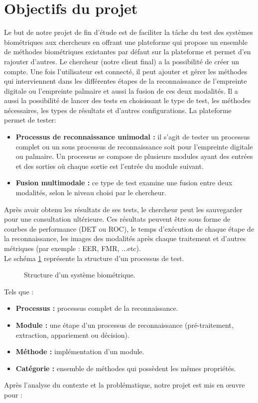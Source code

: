 \section{Objectifs du projet}
Le but de notre projet de fin d’étude est de faciliter la tâche du test des systèmes biométriques aux chercheurs en offrant une plateforme qui propose un ensemble de méthodes biométriques existantes par défaut sur la plateforme et permet d'en rajouter d'autres. Le chercheur (notre client final) a la possibilité de créer un compte. Une fois l’utilisateur est connecté, il peut ajouter et gérer les méthodes qui interviennent dans les différentes étapes de la reconnaissance de l’empreinte digitale ou l’empreinte palmaire et aussi la fusion de ces deux modalités. Il a aussi la possibilité de lancer des tests en choisissant le type de test, les méthodes nécessaires, les types de résultats et d’autres configurations. La plateforme permet de tester:
\begin{itemize}
	\item \textbf{Processus de reconnaissance unimodal :} il s'agit de tester un processus complet ou un sous processus de reconnaissance soit pour l'empreinte digitale ou palmaire. Un processus se compose de plusieurs modules ayant des entrées et des sorties où chaque sortie est l'entrée du module suivant.
	
	\item \textbf{Fusion multimodale :} ce type de test examine une fusion entre deux modalités, selon le niveau choisi par le chercheur.
\end{itemize}
	Après avoir obtenu les résultats de ses tests, le chercheur peut les sauvegarder pour une consultation ultérieure. Ces résultats peuvent être sous forme de courbes de performance (DET ou ROC), le temps d’exécution de chaque étape de la reconnaissance, les images des modalités après chaque traitement et d’autres métriques (par exemple : EER, FMR, ...etc).\\
Le schéma \ref{archisysmultimodal} représente la structure d'un processus de test.
\begin{figure}[H]
	\centering
	\caption{Structure d’un système biométrique.}
	\label{archisysmultimodal}
\end{figure}
Tels que :
\begin{itemize}
	\item \textbf{Processus :} processus complet de la reconnaissance. 
	\item \textbf{Module :} une étape d’un processus de reconnaissance (pré-traitement, extraction, appariement ou décision).
	\item \textbf{Méthode :} implémentation d’un module.
	\item \textbf{Catégorie :} ensemble de méthodes qui possèdent les mêmes propriétés.
\end{itemize}
Après l'analyse du contexte et la problématique, notre projet est mis en œuvre pour :

